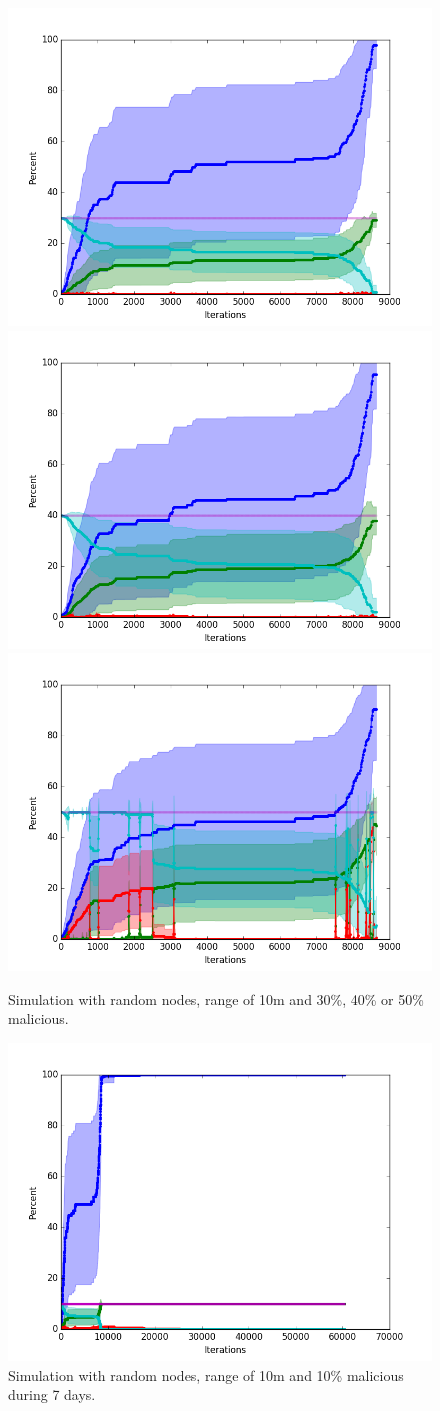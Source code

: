 \documentclass[conference]{IEEEtran}
\begin{document}

\begin{figure}
\centering
\includegraphics[width=0.3\linewidth]{Network_rA/10_30}
\includegraphics[width=0.3\linewidth]{Network_rA/10_40}
\includegraphics[width=0.3\linewidth]{Network_rA/10_50}
\caption{Simulation with random nodes, range of 10m and 30\%, 40\% or 50\% malicious.}
\label{fig:random1}
\end{figure}

%


\begin{figure}
\centering
\includegraphics[width=0.7\linewidth]{Network_rA7/10_10}
\caption{Simulation with random nodes, range of 10m and 10\% malicious during 7 days.} \label{fig:random7}
\end{figure}
\end{document}
